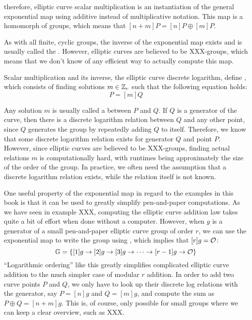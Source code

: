 therefore, elliptic curve scalar multiplication is an instantiation of the general exponential map using additive instead of multiplicative notation. This map is a homomorph of groups, which means that $[n+m]P = [n]P \oplus [m]P$. 

As with all finite, cyclic groups, the inverse of the exponential map exists and is usually called the . However, elliptic curves are believed to be XXX-groups, which means that we don't know of any efficient way to actually compute this map.

Scalar multiplication and its inverse, the elliptic curve discrete logarithm, define , which consists of finding solutions $m\in\mathbb{Z}_r$ such that the following equation holds:
\begin{equation}
P = [m]Q
\end{equation}

Any solution $m$ is usually called a  between $P$ and $Q$. If $Q$ is a generator of the curve, then there is a discrete logarithm relation between $Q$ and any other point, since $Q$ generates the group by repeatedly adding $Q$ to itself. Therefore, we know that some discrete logarithm relation exists for generator $Q$ and point $P$. However, since elliptic curves are believed to be XXX-groups, finding actual relations $m$ is computationally hard, with runtimes being approximately the size of the order of the group. In practice, we often need the assumption that a discrete logarithm relation exists, while the relation itself is not known.

One useful property of the exponential map in regard to the examples in this book is that it can be used to greatly simplify pen-and-paper computations. As we have seen in example XXX, computing the elliptic curve addition law takes quite a bit of effort when done without a computer. However, when $g$ is a generator of a small pen-and-paper elliptic curve group of order $r$, we can use the exponential map to write the group using , which implies that $[r]g=\mathcal{O}$:
\begin{equation}\label{cofactor-clearing}
\mathbb{G} = \{[1]g\to [2]g \to [3]g\to\cdots\to [r-1]g\to \mathcal{O}\}
\end{equation} 
``Logarithmic ordering'' like this greatly simplifies complicated elliptic curve addition to the much simpler case of modular $r$ addition. In order to add two curve points $P$ and $Q$, we only have to look up their discrete log relations with the generator, say $P=[n]g$ and $Q=[m]g$, and compute the sum as $P\oplus Q = [n+m]g$. This is, of course, only possible for small groups where we can keep a clear overview, such as XXX.

